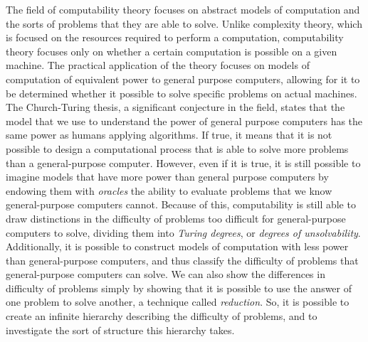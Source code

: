 \documentclass[psamsfonts]{amsart}
\theoremstyle{definition}
\theoremstyle{remark}
\numberwithin{equation}{section}
\begin{document}
The field of computability theory focuses on abstract models of computation and
the sorts of problems that they are able to solve. Unlike complexity theory,
which is focused on the resources required to perform a computation,
computability theory focuses only on whether a certain computation is possible
on a given machine. The practical application of the theory focuses on models of
computation of equivalent power to general purpose computers, allowing for it to
be determined whether it possible to solve specific problems on actual
machines. The Church-Turing thesis, a significant conjecture in the field,
states that the model that we use to understand the power of general purpose
computers has the same power as humans applying algorithms. If true, it means
that it is not possible to design a computational process that is able to solve
more problems than a general-purpose computer. However, even if it is true, it is still possible to
imagine models that have more power than general purpose computers by endowing
them with \emph{oracles} the ability to evaluate problems that we know
general-purpose computers cannot. Because of this, computability is still able
to draw distinctions in the difficulty of problems too difficult for
general-purpose computers to solve, dividing them into \emph{Turing degrees}, or
\emph{degrees of unsolvability}. Additionally, it is possible to construct
models of computation with less power than general-purpose computers, and thus
classify the difficulty of problems that general-purpose computers can solve. We
can also show the differences in difficulty of problems simply by showing that
it is possible to use the answer of one problem to solve another, a technique
called \emph{reduction}. So, it is possible to create an infinite hierarchy
describing the difficulty of problems, and to investigate the sort of structure
this hierarchy takes. 




\end{document}
